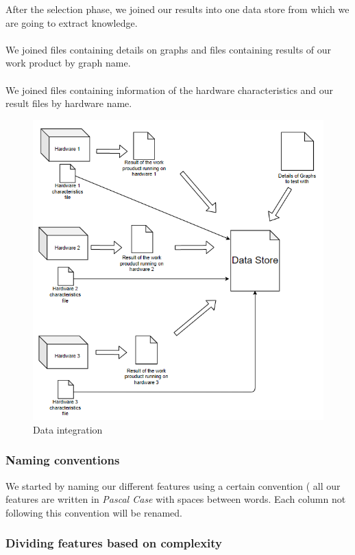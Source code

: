 After the selection phase, we joined our results into one data store from which we are going to extract knowledge.
\\
\\
We joined files containing details on graphs and files containing results of our work product by graph name.
\\
\\
We joined files containing information of the hardware characteristics and our result files by hardware name.
\begin{figure}[h!]
    \centering
    \includegraphics{chapters/merge data.png}
    \caption{Data integration}
    \label{fig:Data integration}
\end{figure}
\FloatBarrier

\subsubsection{Naming conventions}

We started by naming our different features using a certain convention ( all our features are written in \textit{Pascal Case} with spaces between words. Each column not following this convention will be renamed.

\subsubsection{Dividing features based on complexity}

